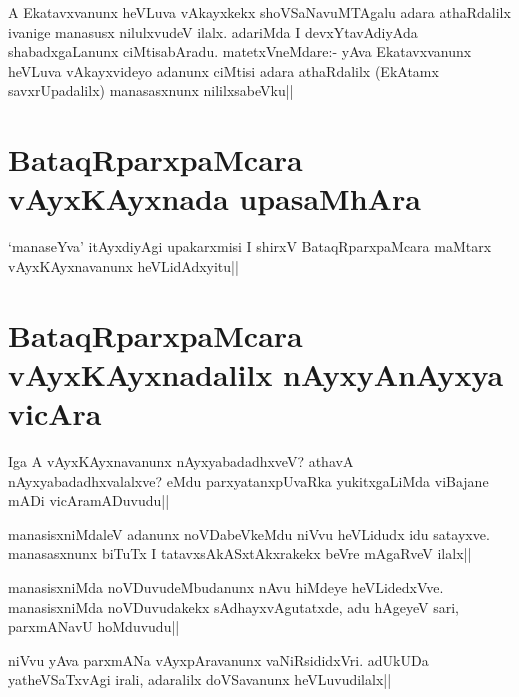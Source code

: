 \begin{artha} 
A Ekatavxvanunx heVLuva vAkayxkekx shoVSaNavuMTAgalu adara athaRdalilx 
ivanige manasusx nilulxvudeV ilalx. adariMda I devxYtavAdiyAda 
shabadxgaLanunx ciMtisabAradu. matetxVneMdare:- yAva Ekatavxvanunx 
heVLuva vAkayxvideyo adanunx ciMtisi adara athaRdalilx (EkAtamx 
savxrUpadalilx) manasasxnunx nililxsabeVku||
\end{artha}

\section*{BataqRparxpaMcara vAyxKAyxnada upasaMhAra}

\begin{artha} 
`manaseYva' itAyxdiyAgi upakarxmisi I shirxV BataqRparxpaMcara maMtarx 
vAyxKAyxnavanunx heVLidAdxyitu||
\end{artha}

\section*{BataqRparxpaMcara vAyxKAyxnadalilx nAyxyAnAyxya vicAra}

\begin{artha} 
Iga A vAyxKAyxnavanunx nAyxyabadadhxveV? athavA nAyxyabadadhxvalalxve? 
eMdu parxyatanxpUvaRka yukitxgaLiMda viBajane mADi vicAramADuvudu||
\end{artha}


\begin{artha} 
manasisxniMdaleV adanunx noVDabeVkeMdu niVvu heVLidudx idu satayxve. 
manasasxnunx biTuTx I tatavxsAkASxtAkxrakekx beVre mAgaRveV ilalx||
\end{artha}

\begin{artha} 
manasisxniMda noVDuvudeMbudanunx nAvu hiMdeye heVLidedxVve. 
manasisxniMda noVDuvudakekx sAdhayxvAgutatxde, adu hAgeyeV sari, 
parxmANavU hoMduvudu||
\end{artha}


\begin{artha} 
niVvu yAva parxmANa vAyxpAravanunx vaNiRsididxVri. adUkUDa 
yatheVSaTxvAgi irali, adaralilx doVSavanunx heVLuvudilalx||
\end{artha}


